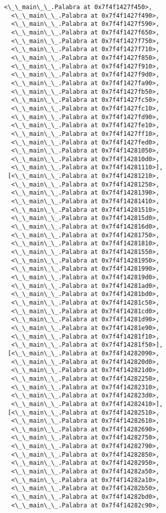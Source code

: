 \documentclass[12pt,a4paper,table]{article}
\begin{document}
\begin{tcolorbox}[breakable, size=fbox, boxrule=.5pt, pad at break*=1mm, opacityfill=0]
\begin{Verbatim}[commandchars=\\\{\}]
  <\_\_main\_\_.Palabra at 0x7f4f1427f450>,
  <\_\_main\_\_.Palabra at 0x7f4f1427f490>,
  <\_\_main\_\_.Palabra at 0x7f4f1427f590>,
  <\_\_main\_\_.Palabra at 0x7f4f1427f650>,
  <\_\_main\_\_.Palabra at 0x7f4f1427f750>,
  <\_\_main\_\_.Palabra at 0x7f4f1427f710>,
  <\_\_main\_\_.Palabra at 0x7f4f1427f850>,
  <\_\_main\_\_.Palabra at 0x7f4f1427f910>,
  <\_\_main\_\_.Palabra at 0x7f4f1427f9d0>,
  <\_\_main\_\_.Palabra at 0x7f4f1427fa90>,
  <\_\_main\_\_.Palabra at 0x7f4f1427fb50>,
  <\_\_main\_\_.Palabra at 0x7f4f1427fc50>,
  <\_\_main\_\_.Palabra at 0x7f4f1427fc10>,
  <\_\_main\_\_.Palabra at 0x7f4f1427fd90>,
  <\_\_main\_\_.Palabra at 0x7f4f1427fe10>,
  <\_\_main\_\_.Palabra at 0x7f4f1427ff10>,
  <\_\_main\_\_.Palabra at 0x7f4f1427fed0>,
  <\_\_main\_\_.Palabra at 0x7f4f14281050>,
  <\_\_main\_\_.Palabra at 0x7f4f142810d0>,
  <\_\_main\_\_.Palabra at 0x7f4f14281110>],
 [<\_\_main\_\_.Palabra at 0x7f4f14281210>,
  <\_\_main\_\_.Palabra at 0x7f4f14281250>,
  <\_\_main\_\_.Palabra at 0x7f4f14281390>,
  <\_\_main\_\_.Palabra at 0x7f4f14281410>,
  <\_\_main\_\_.Palabra at 0x7f4f14281510>,
  <\_\_main\_\_.Palabra at 0x7f4f142815d0>,
  <\_\_main\_\_.Palabra at 0x7f4f142816d0>,
  <\_\_main\_\_.Palabra at 0x7f4f14281750>,
  <\_\_main\_\_.Palabra at 0x7f4f14281810>,
  <\_\_main\_\_.Palabra at 0x7f4f14281550>,
  <\_\_main\_\_.Palabra at 0x7f4f14281950>,
  <\_\_main\_\_.Palabra at 0x7f4f14281990>,
  <\_\_main\_\_.Palabra at 0x7f4f142819d0>,
  <\_\_main\_\_.Palabra at 0x7f4f14281ad0>,
  <\_\_main\_\_.Palabra at 0x7f4f14281bd0>,
  <\_\_main\_\_.Palabra at 0x7f4f14281c50>,
  <\_\_main\_\_.Palabra at 0x7f4f14281cd0>,
  <\_\_main\_\_.Palabra at 0x7f4f14281d90>,
  <\_\_main\_\_.Palabra at 0x7f4f14281e90>,
  <\_\_main\_\_.Palabra at 0x7f4f14281f10>,
  <\_\_main\_\_.Palabra at 0x7f4f14281f50>],
 [<\_\_main\_\_.Palabra at 0x7f4f14282090>,
  <\_\_main\_\_.Palabra at 0x7f4f142820d0>,
  <\_\_main\_\_.Palabra at 0x7f4f142821d0>,
  <\_\_main\_\_.Palabra at 0x7f4f14282250>,
  <\_\_main\_\_.Palabra at 0x7f4f14282310>,
  <\_\_main\_\_.Palabra at 0x7f4f142823d0>,
  <\_\_main\_\_.Palabra at 0x7f4f14282410>],
 [<\_\_main\_\_.Palabra at 0x7f4f14282510>,
  <\_\_main\_\_.Palabra at 0x7f4f14282610>,
  <\_\_main\_\_.Palabra at 0x7f4f14282690>,
  <\_\_main\_\_.Palabra at 0x7f4f14282750>,
  <\_\_main\_\_.Palabra at 0x7f4f14282790>,
  <\_\_main\_\_.Palabra at 0x7f4f14282850>,
  <\_\_main\_\_.Palabra at 0x7f4f14282950>,
  <\_\_main\_\_.Palabra at 0x7f4f14282a50>,
  <\_\_main\_\_.Palabra at 0x7f4f14282a10>,
  <\_\_main\_\_.Palabra at 0x7f4f14282b50>,
  <\_\_main\_\_.Palabra at 0x7f4f14282bd0>,
  <\_\_main\_\_.Palabra at 0x7f4f14282c90>,

\end{Verbatim}
\end{tcolorbox}
\end{document}
